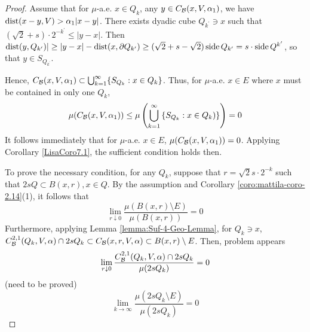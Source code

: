 \begin{proof}
    Assume that for $\mu$-a.e. $x\in Q_k$, any $y\in C_\mathcal B(x, V, \alpha_1)$, we have $\operatorname{dist}(x-y,V)>\alpha_1|x-y|$. {\color{red}There exists dyadic cube $Q_{k^\prime}\ni x$ such that $(\sqrt{2}+s)\cdot 2^{-k^\prime} \leq |y-x|$. Then $\operatorname{dist}(y, Q_{k^\prime})|\geq |y-x|-\operatorname{dist}(x, \partial Q_{k^\prime})\geq (\sqrt{2} +s-\sqrt{2})\operatorname{side} Q_{k^\prime} = s\cdot\operatorname{side} Q^{k^\prime}$, so that $y\in S_{Q_{k^\prime}}$.}
    
    
    
    Hence, $C_\mathcal B(x, V, \alpha_1)\subset \bigcup_{k=1}^\infty \{S_{Q_k}: x\in Q_k\}$. Thus, for $\mu$-a.e. $x\in E$ where $x$ must be contained in only one $Q_k$,
    \begin{equation*}
        \begin{split}
            \mu(C_\mathcal B(x, V, \alpha_1))\leq \mu\left( \bigcup_{k=1}^\infty \left\{S_{Q_k}:x\in Q_k \right)\}\right) = 0
        \end{split}
    \end{equation*}
    It follows immediately that for $\mu$-a.e. $x\in E$, $\mu(C_\mathcal B(x, V, \alpha_1)) = 0$. Applying Corollary \ref{LisaCoro7.1}, the sufficient condition holds then.




    {\color{red}
    To prove the necessary condition, for any $Q_k$, suppose that $r = \sqrt{2}s\cdot 2^{-k}$ such that $2sQ\subset B(x,r), x\in Q$. By the assumption and Corollary \ref{coro:mattila-coro-2.14}(1), it follows that
    \begin{equation*}
        \lim_{r\downarrow 0}\frac{\mu(B(x, r)\setminus E)}{\mu(B(x,r))} =0
    \end{equation*}
    Furthermore, applying Lemma \ref{lemma:Suf-4-Geo-Lemma}, for $Q_k\ni x$,
    $C_\mathcal B^{2,1}(Q_k, V, \alpha)\cap 2sQ_k \subset C_\mathcal B(x, r,V, \alpha)\subset B(x, r)\setminus E$. Then, problem appears
    \begin{equation*}
        \lim_{r\downarrow 0}\frac{C_\mathcal B^{2,1}(Q_k, V, \alpha)\cap 2sQ_k}{\mu(2sQ_k)} =0
    \end{equation*}
    (need to be proved)
    \begin{equation*}
        \lim_{k\rightarrow \infty}\frac{\mu(2sQ_k \setminus E)}{\mu(2sQ_k)} =0
    \end{equation*}

}
\end{proof}
